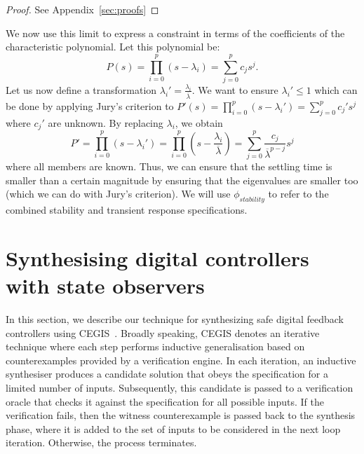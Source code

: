 \documentclass[sigconf]{llncs}
\begin{document}
\begin{proof}
See Appendix~\ref{sec:proofs}
\end{proof}
%
We now use this limit to express a constraint in terms of the
coefficients of the characteristic polynomial.  Let this
polynomial be:
%
\begin{equation}
P(s)=\prod_{i=0}^p (s-\lambda_i)=\sum_{j=0}^p c_js^j.
\end{equation}
%
Let us now define a
transformation $\lambda_i'=\frac{\lambda_i}{\overline{\lambda}}$.  We want
to ensure $\lambda_i' \leq 1$ which can be done by applying Jury's criterion
to $P'(s)=\prod_{i=0}^p (s-\lambda_i')=\sum_{j=0}^p c_j's^j$ where $c_j'$ are
unknown.  By replacing $\lambda_i$, we obtain
%
\begin{equation}
P'=\prod_{i=0}^p (s-\lambda_i')=\prod_{i=0}^p \left(s-\frac{\lambda_i}{\overline{\lambda}}\right)=\sum_{j=0}^p \frac{c_j}{\overline{\lambda}^{p-j}}s^j
\end{equation}
%
where all members are known. Thus, we can ensure that the settling time is smaller than
a certain magnitude by ensuring that 
the eigenvalues are smaller too (which we can do with Jury's criterion).
We will use $\phi_{stability}$ to refer to the combined stability and transient response specifications.

\section{Synthesising digital controllers with state observers}\label{sec:dynamic_synth}


In this section, we describe our technique for synthesizing safe
digital feedback controllers using CEGIS~\cite{DBLP:conf/asplos/2006}. Broadly speaking, CEGIS
denotes an iterative technique where each step performs inductive
generalisation based on counterexamples provided by a verification
engine. In each iteration, an inductive synthesiser produces a
candidate solution that obeys the specification for a limited number
of inputs. Subsequently, this candidate is passed to a verification
oracle that checks it against the specification for all possible
inputs. If the verification fails, then the witness counterexample is
passed back to the synthesis phase, where it is added to the set of
inputs to be considered in the next loop iteration. Otherwise, the process terminates.
\end{document}
